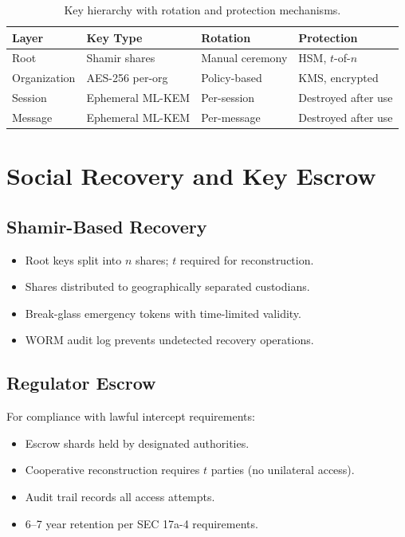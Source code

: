 \documentclass[11pt,letterpaper]{article}
\begin{document}
\begin{table}[H]
\centering
\small
\begin{tabular}{@{}llll@{}}
\toprule
\textbf{Layer} & \textbf{Key Type} & \textbf{Rotation} & \textbf{Protection} \\
\midrule
Root & Shamir shares & Manual ceremony & HSM, $t$-of-$n$ \\
Organization & AES-256 per-org & Policy-based & KMS, encrypted \\
Session & Ephemeral ML-KEM & Per-session & Destroyed after use \\
Message & Ephemeral ML-KEM & Per-message & Destroyed after use \\
\bottomrule
\end{tabular}
\caption{Key hierarchy with rotation and protection mechanisms.}
\label{tab:key-hierarchy}
\end{table}

\section{Social Recovery and Key Escrow}

\subsection{Shamir-Based Recovery}

\begin{itemize}
\item Root keys split into $n$ shares; $t$ required for reconstruction.
\item Shares distributed to geographically separated custodians.
\item Break-glass emergency tokens with time-limited validity.
\item WORM audit log prevents undetected recovery operations.
\end{itemize}

\subsection{Regulator Escrow}

For compliance with lawful intercept requirements:
\begin{itemize}
\item Escrow shards held by designated authorities.
\item Cooperative reconstruction requires $t$ parties (no unilateral access).
\item Audit trail records all access attempts.
\item 6--7 year retention per SEC 17a-4 requirements.
\end{itemize}
\end{document}
